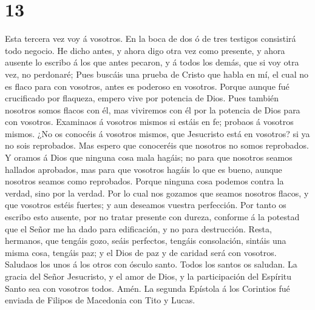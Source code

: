 \hypertarget{section-12}{%
\section{13}\label{section-12}}

 Esta tercera vez voy á vosotros. En la boca de dos ó de
tres testigos consistirá todo negocio.  He dicho antes, y
ahora digo otra vez como presente, y ahora ausente lo escribo á los que
antes pecaron, y á todos los demás, que si voy otra vez, no perdonaré;
 Pues buscáis una prueba de Cristo que habla en mí, el cual
no es flaco para con vosotros, antes es poderoso en vosotros.
 Porque aunque fué crucificado por flaqueza, empero vive por
potencia de Dios. Pues también nosotros somos flacos con él, mas
viviremos con él por la potencia de Dios para con vosotros. 
Examinaos á vosotros mismos si estáis en fe; probaos á vosotros mismos.
¿No os conocéis á vosotros mismos, que Jesucristo está en vosotros? si
ya no sois reprobados.  Mas espero que conoceréis que
nosotros no somos reprobados.  Y oramos á Dios que ninguna
cosa mala hagáis; no para que nosotros seamos hallados aprobados, mas
para que vosotros hagáis lo que es bueno, aunque nosotros seamos como
reprobados.  Porque ninguna cosa podemos contra la verdad,
sino por la verdad.  Por lo cual nos gozamos que seamos
nosotros flacos, y que vosotros estéis fuertes; y aun deseamos vuestra
perfección.  Por tanto os escribo esto ausente, por no
tratar presente con dureza, conforme á la potestad que el Señor me ha
dado para edificación, y no para destrucción.  Resta,
hermanos, que tengáis gozo, seáis perfectos, tengáis consolación,
sintáis una misma cosa, tengáis paz; y el Dios de paz y de caridad será
con vosotros.  Saludaos los unos á los otros con ósculo
santo. Todos los santos os saludan.  La gracia del Señor
Jesucristo, y el amor de Dios, y la participación del Espíritu Santo sea
con vosotros todos. Amén. La segunda Epístola á los Corintios fué
enviada de Filipos de Macedonia con Tito y Lucas. 
